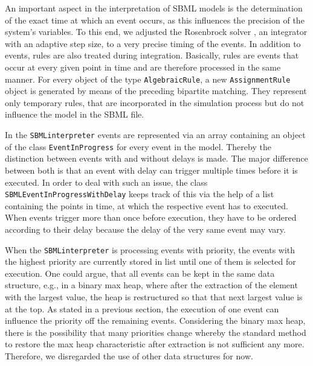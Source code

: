 \documentclass[10pt]{bmc_article}
\newenvironment{bmcformat}{\baselineskip20pt\sloppy\setboolean{publ}{false}}{\baselineskip20pt\sloppy}
\newcommand{\AlgebraicRule}{\texttt{Algebraic\-Rule}}
\newcommand{\AssignmentRule}{\texttt{Assignment\-Rule}}
\newcommand{\SBMLinterpreter}{\texttt{SBML\-interpreter}}
\newcommand{\EventInProgress}{\texttt{Event\-In\-Progress}}
\newcommand{\SBMLEventInProgressWithDelay}{\texttt{SBML\-Event\-In\-Progress\-With\-Delay}}
\begin{document}
\begin{bmcformat}
%
An important aspect in the interpretation of SBML models is the
determination of the exact time at which an event occurs, as this influences
the precision of the system's variables. To this end, we adjusted the Rosenbrock
solver \cite{Kotcon2011}, an integrator with an adaptive step size, to a very
precise timing of the events.
%
In addition to events, rules are also treated during integration.
Basically, rules are events that occur at every given point in time and are therefore processed in the same manner.
For every object of the type \AlgebraicRule{}, a new \AssignmentRule{} object is generated by means of the preceding bipartite matching.
They represent only temporary rules, that are incorporated in the simulation process but do not influence the model in the SBML file.
%

In the \SBMLinterpreter{} events are represented via an array containing an object of the class \EventInProgress{} for every event in the model.
Thereby the distinction between events with and without delays is made.
The major difference between both is that an event with delay can trigger multiple times before it is executed.
In order to deal with such an issue, the class \SBMLEventInProgressWithDelay{} keeps track of this via the help of a list containing the points in time, at which the respective event has to executed.
When events trigger more than once before execution, they have to be ordered according to their delay because the delay of the very same event may vary.

When the \SBMLinterpreter{} is processing events with priority, the events with the highest priority 
are currently stored in list until one of them is selected for execution. One could argue, that all events can
be kept in the same data structure, e.g., in a binary max heap, where after the extraction of the element with the largest value, the heap is restructured so that that next largest value is at the top.
As stated in a previous section, the execution of one event can influence the priority off the remaining events.
Considering the binary max heap, there is the possibility that many priorities change whereby the standard
method to restore the max heap characteristic after extraction is not sufficient any more.
Therefore, we disregarded the use of other data structures for now.
%


\end{bmcformat}
\end{document}
